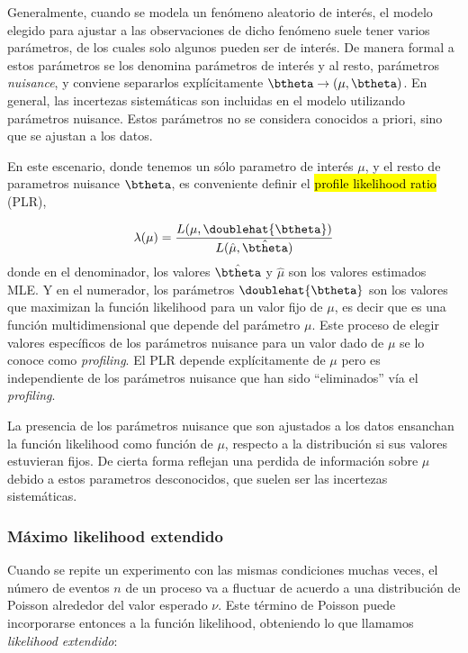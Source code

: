 Generalmente, cuando se modela un fenómeno aleatorio de interés, el modelo
elegido para ajustar a las observaciones de dicho fenómeno suele tener varios
parámetros, de los cuales solo algunos pueden ser de interés. De manera formal a
estos parámetros se los denomina parámetros de interés y al resto, parámetros
\emph{nuisance}, y conviene separarlos explícitamente $\btheta \to (\mu,
\btheta)$. En general, las incertezas sistemáticas son incluidas en el modelo
utilizando parámetros nuisance. Estos parámetros no se considera conocidos a
priori, sino que se ajustan a los datos.

En este escenario, donde tenemos un sólo parametro de interés
$\mu$, y el resto de parametros nuisance $\btheta$, es conveniente
definir el \hl{profile likelihood ratio} (PLR),

\begin{equation}
  \lambda(\mu) = \frac{L(\mu,\doublehat{\btheta})}{L(\hat{\mu},\hat{\btheta})}
\end{equation}
%
donde en el denominador, los valores $\hat{\btheta}$ y $\hat{\mu}$ son los
valores estimados MLE. Y en el numerador, los parámetros {$\doublehat{\btheta}$}
son los valores que maximizan la función likelihood para un valor fijo de $\mu$,
es decir que es una función multidimensional que depende del parámetro $\mu$.
Este proceso de elegir valores específicos de los parámetros
nuisance para un valor dado de $\mu$ se lo conoce como \emph{profiling}. El PLR
depende explícitamente de $\mu$ pero es independiente de los parámetros
nuisance que han sido ``eliminados'' vía el \emph{profiling}.

La presencia de los parámetros nuisance que son ajustados a los datos ensanchan
la función likelihood como función de $\mu$, respecto a la distribución si sus
valores estuvieran fijos. De cierta forma reflejan una perdida de información
sobre $\mu$ debido a estos parametros desconocidos, que suelen ser
las incertezas sistemáticas.



\subsubsection{Máximo likelihood extendido}

Cuando se repite un experimento con las mismas condiciones muchas veces, el
número de eventos $n$ de un proceso va a fluctuar de acuerdo a una distribución
de Poisson alrededor del valor esperado $\nu$. Este término de Poisson puede
incorporarse entonces a la función likelihood, obteniendo lo que llamamos
\emph{likelihood extendido}:

